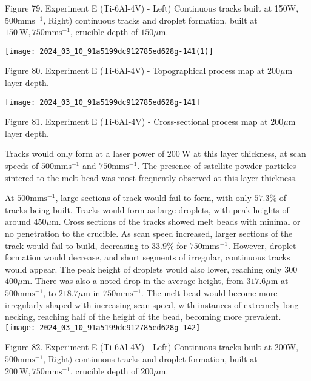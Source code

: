 \documentclass[10pt]{article}
\begin{document}
Figure 79. Experiment E (Ti-6Al-4V) - Left) Continuous tracks built at 150W, $500 \mathrm{mms}^{-1}$, Right) continuous tracks and droplet formation, built at $150 \mathrm{~W}, 750 \mathrm{mms}^{-1}$, crucible depth of $150 \mu \mathrm{m}$.

\begin{center}
\texttt{[image: 2024\_03\_10\_91a5199dc912785ed628g-141(1)]}
\end{center}

Figure 80. Experiment E (Ti-6Al-4V) - Topographical process map at $200 \mu \mathrm{m}$ layer depth.

\begin{center}
\texttt{[image: 2024\_03\_10\_91a5199dc912785ed628g-141]}
\end{center}

Figure 81. Experiment E (Ti-6AI-4V) - Cross-sectional process map at $200 \mu \mathrm{m}$ layer depth.

Tracks would only form at a laser power of $200 \mathrm{~W}$ at this layer thickness, at scan speeds of $500 \mathrm{mms}^{-1}$ and $750 \mathrm{mms}^{-1}$. The presence of satellite powder particles sintered to the melt bead was most frequently observed at this layer thickness.

At $500 \mathrm{mms}^{-1}$, large sections of track would fail to form, with only $57.3 \%$ of tracks being built. Tracks would form as large droplets, with peak heights of around $450 \mu \mathrm{m}$. Cross sections of the tracks showed melt beads with minimal or no penetration to the crucible. As scan speed increased, larger sections of the track would fail to build, decreasing to $33.9 \%$ for $750 \mathrm{mms}^{-1}$. However, droplet formation would decrease, and short segments of irregular, continuous tracks would appear. The peak height of droplets would also lower, reaching only 300$400 \mu \mathrm{m}$. There was also a noted drop in the average height, from $317.6 \mu \mathrm{m}$ at $500 \mathrm{mms}^{-1}$, to $218.7 \mu \mathrm{m}$ in $750 \mathrm{mms}^{-1}$. The melt bead would become more irregularly shaped with increasing scan speed, with instances of extremely long necking, reaching half of the height of the bead, becoming more prevalent.\\
\texttt{[image: 2024\_03\_10\_91a5199dc912785ed628g-142]}

Figure 82. Experiment E (Ti-6Al-4V) - Left) Continuous tracks built at 200W, $500 \mathrm{mms}^{-1}$, Right) continuous tracks and droplet formation, built at $200 \mathrm{~W}, 750 \mathrm{mms}^{-1}$, crucible depth of $200 \mu \mathrm{m}$.
\end{document}
